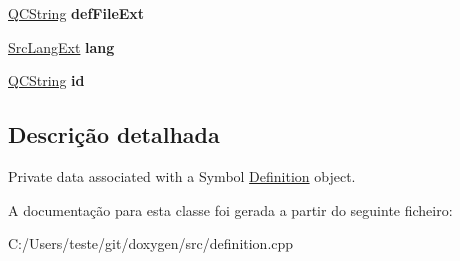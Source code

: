 \begin{DoxyCompactItemize}
\item 
\hypertarget{class_definition_impl_a4919b957a22129164ae312019c604a50}{\hyperlink{class_q_c_string}{Q\-C\-String} {\bfseries def\-File\-Ext}}\label{class_definition_impl_a4919b957a22129164ae312019c604a50}

\item 
\hypertarget{class_definition_impl_a8fb5884a6d7ef3c2caf306ee89a7f79e}{\hyperlink{types_8h_a9974623ce72fc23df5d64426b9178bf2}{Src\-Lang\-Ext} {\bfseries lang}}\label{class_definition_impl_a8fb5884a6d7ef3c2caf306ee89a7f79e}

\item 
\hypertarget{class_definition_impl_ac4d9c74c3dc66b375a8567a153a09fc2}{\hyperlink{class_q_c_string}{Q\-C\-String} {\bfseries id}}\label{class_definition_impl_ac4d9c74c3dc66b375a8567a153a09fc2}

\end{DoxyCompactItemize}


\subsection{Descrição detalhada}
Private data associated with a Symbol \hyperlink{class_definition}{Definition} object. 

A documentação para esta classe foi gerada a partir do seguinte ficheiro\-:\begin{DoxyCompactItemize}
\item 
C\-:/\-Users/teste/git/doxygen/src/definition.\-cpp\end{DoxyCompactItemize}
